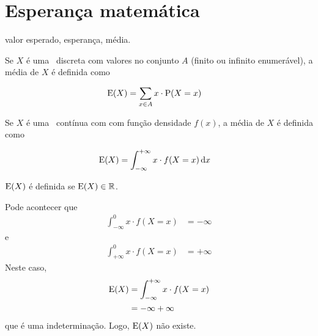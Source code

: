 \section{Esperança matemática}

\begin{synonyms}
    valor esperado, esperança, média.
\end{synonyms}

Se $X$ é uma \va\ discreta com valores no conjunto $A$
(finito ou infinito enumerável), a média de $X$ é
definida como

\begin{align}
    \operatorname{E}(X) &= \sum_{x \in A} x\cdot\operatorname{P}(X=x)
    \label{eq:ch02-esperança-discreta}
\end{align}

Se $X$ é uma \va\ contínua com com função densidade $f(x)$,
a média de $X$ é definida como

\begin{align}
    \operatorname{E}(X) &= \int_{-\infty}^{+\infty} x\cdot f(X=x) \,\mathrm{d} x
    \label{eq:ch02-esperança-continua}
\end{align}

\begin{obs}
    $\operatorname{E}(X)$ é definida se $\operatorname{E}(X) \in \operatorname{\mathbb{R}}$.

    Pode acontecer que
    \begin{align*}
        \int_{-\infty}^{0} x\cdot f(X=x) &= -\infty
    \end{align*}
    e
    \begin{align*}
        \int_{+\infty}^{0} x\cdot f(X=x) &= +\infty
    \end{align*}
    Neste caso,
    \begin{align*}
        \operatorname{E}(X) &= \int_{-\infty}^{+\infty} x\cdot f(X=x) \\
        &= -\infty +\infty
    \end{align*}
    que é uma indeterminação. Logo, $\operatorname{E}(X)$ não existe.
\end{obs}

